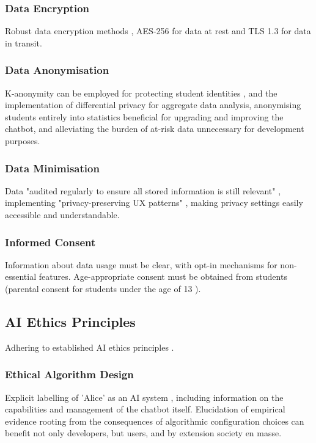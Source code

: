 \documentclass[14pt,a4paper]{article}
\begin{document}
\begin{multicols}{2}
\subsubsection*{Data Encryption}
Robust data encryption methods \textit{\parencite[pp. 100-150]{Stallings2023}}, AES-256 for data at rest and TLS 1.3 for data in transit.

\subsubsection{Data Anonymisation}
K-anonymity can be employed for protecting student identities \textit{\parencite[pp. 75-100]{ElEmamArbuckle2023}}, and the implementation of differential privacy for aggregate data analysis, anonymising students entirely into statistics beneficial for upgrading and improving the chatbot, and alleviating the burden of at-risk data unnecessary for development purposes.

\subsubsection{Data Minimisation}
Data "audited regularly to ensure all stored information is still relevant" \textit{\parencite{A29WP2018}}, implementing "privacy-preserving UX patterns" \textit{\parencite[pp. 50-100]{Hartzog2023}}, making privacy settings easily accessible and understandable.
\subsubsection*{Informed Consent}
Information about data usage must be clear, with opt-in mechanisms for non-essential features. Age-appropriate consent must be obtained from students (parental consent for students under the age of 13 \textit{\parencite{FTC2023}}).

\newpage
\subsection{AI Ethics Principles}
Adhering to established AI ethics principles \textit{\parencite{EC2024}}.


\subsubsection{Ethical Algorithm Design}
Explicit labelling of 'Alice' as an AI system \textit{\parencite{IEEE2023}}, including information on the capabilities and management of the chatbot itself. Elucidation of empirical evidence rooting from the consequences of algorithmic configuration choices can benefit not only developers, but users, and by extension society en masse.


\end{multicols}
\end{document}
